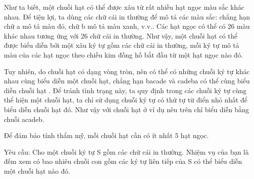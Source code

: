 Như ta biết, một chuỗi hạt có thể được xâu từ rất nhiều hạt ngọc màu sắc khác nhau. Để tiện lợi, ta dùng các chữ cái in thường để mô tả các màu sắc: chẳng hạn chữ a mô tả màu đỏ, chữ b mô tả màu xanh, v.v.. Các hạt ngọc có thể có 26 màu khác nhau tương ứng với 26 chữ cái in thường. Như vậy, một chuỗi hạt có thể được biểu diễn bởi một xâu ký tự gồm các chữ cái in thường, mỗi ký tự mô tả màu của các hạt ngọc theo chiều kim đồng hồ bắt đầu từ một hạt ngọc nào đó.  

   Tuy nhiên, do chuỗi hạt có dạng vòng tròn, nên có thể có những chuỗi ký tự khác nhau cùng biểu diễn một chuỗi hạt, chẳng hạn bacade và cadeba có thể cùng biểu diễn chuỗi hạt . Để tránh tình trạng này, ta quy định trong các chuỗi ký tự cùng thể hiện một chuỗi hạt, ta chỉ sử dụng chuỗi ký tự có thứ tự từ điển nhỏ nhất để biểu diễn chuỗi hạt đó. Như vậy với chuỗi hạt ở ví dụ nêu trên chỉ biểu diễn bằng chuỗi acadeb.  

   Để đảm bảo tính thẩm mỹ, mỗi chuỗi hạt cần có ít nhất 5 hạt ngọc.  

   Yêu cầu: Cho một chuỗi ký tự S gồm các chữ cái in thường. Nhiệm vụ của bạn là đếm xem có bao nhiêu chuỗi con gồm các ký tự liên tiếp của S có thể biểu diễn một chuỗi hạt nào đó.  

\